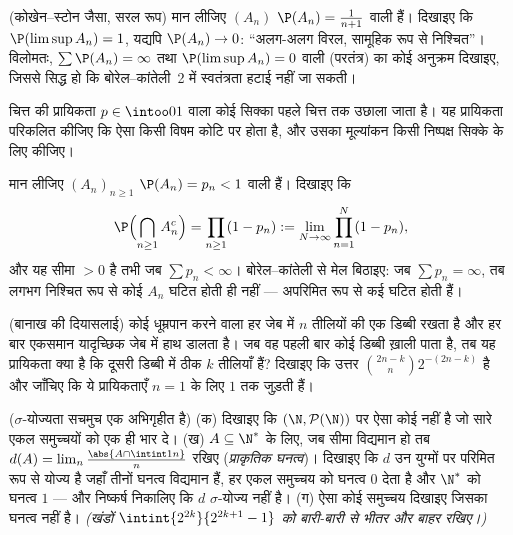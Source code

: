 \begin{exercise}[$\star\star\star$]\label{exo:b2:proba:8}
(कोखेन--स्टोन जैसा, सरल रूप) मान लीजिए $(A_n)$ $\P(A_n) = \frac{1}{n+1}$ वाली  हैं। दिखाइए कि $\P(\limsup A_n) = 1$, यद्यपि $\P(A_n) \to 0$: ``अलग-अलग विरल, सामूहिक
रूप से निश्चित''। विलोमतः, $\sum\P(A_n) = \infty$ तथा $\P(\limsup A_n) = 0$ वाली (परतंत्र)  का कोई
अनुक्रम दिखाइए, जिससे सिद्ध हो कि बोरेल--कांतेली~2 में स्वतंत्रता
हटाई नहीं जा सकती।
\end{exercise}

\begin{exercise}[$\star$]\label{exo:b2:proba:9}
चित्त की प्रायिकता $p \in \intoo01$ वाला कोई सिक्का पहले चित्त तक उछाला जाता
है। यह प्रायिकता परिकलित कीजिए कि ऐसा किसी विषम कोटि पर होता है, और
उसका मूल्यांकन किसी निष्पक्ष सिक्के के लिए कीजिए।
\end{exercise}

\begin{exercise}[$\star\star$]\label{exo:b2:proba:10}
मान लीजिए $(A_n)_{n\geq1}$ $\P(A_n) =
p_n < 1$ वाली  हैं। दिखाइए कि
\[
\P\Bigl(\bigcap_{n\geq1}A_n^c\Bigr)
= \prod_{n\geq1}(1 - p_n)
:= \lim_{N\to\infty}\prod_{n=1}^N(1 - p_n),
\]
और यह सीमा $> 0$ है तभी जब $\sum p_n <
\infty$। बोरेल--कांतेली से मेल बिठाइए: जब
$\sum p_n =
\infty$, तब लगभग निश्चित रूप से कोई $A_n$ घटित होती ही नहीं ---
अपरिमित रूप से कई घटित होती हैं।
\end{exercise}

\begin{exercise}[$\star\star$]\label{exo:b2:proba:11}
(बानाख की दियासलाई) कोई धूम्रपान करने वाला हर जेब में $n$
तीलियों की एक डिब्बी रखता है और हर बार एकसमान यादृच्छिक जेब में
हाथ डालता है। जब वह पहली बार कोई डिब्बी ख़ाली पाता है, तब यह
प्रायिकता क्या है कि दूसरी डिब्बी में ठीक $k$ तीलियाँ हैं? दिखाइए
कि उत्तर $\binom{2n-k}{n}2^{-(2n-k)}$ है और जाँचिए कि ये प्रायिकताएँ $n = 1$ के लिए $1$ तक
जुड़ती हैं।
\end{exercise}

\begin{exercise}[$\star\star\star$]\label{exo:b2:proba:12}
($\sigma$-योज्यता सचमुच एक अभिगृहीत है)
(क) दिखाइए कि $(\N,
\mathcal P(\N))$ पर ऐसा कोई  नहीं है जो सारे एकल
समुच्चयों को एक ही भार दे।
(ख) $A \subseteq \N^*$ के लिए, जब सीमा विद्यमान हो तब $d(A) =
\lim_n\frac{\abs{A\cap\intint1n}}{n}$ रखिए (\emph{प्राकृतिक
घनत्व})। दिखाइए कि $d$ उन युग्मों पर परिमित रूप से योज्य है जहाँ
तीनों घनत्व विद्यमान हैं, हर एकल समुच्चय को घनत्व $0$ देता है और
$\N^*$ को घनत्व $1$ --- और निष्कर्ष निकालिए कि $d$ $\sigma$-योज्य नहीं
है।
(ग) ऐसा कोई समुच्चय दिखाइए जिसका घनत्व नहीं है। \emph{(खंडों $\intint{2^{2k}}{2^{2k+1}-1}$
को बारी-बारी से भीतर और बाहर रखिए।)}
\end{exercise}

